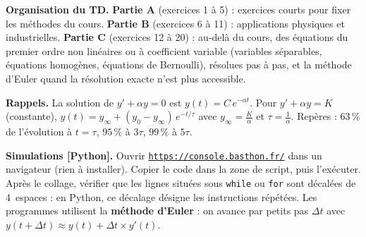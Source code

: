 \documentclass[a4paper,11pt]{article}
\newcommand{\py}{{\color{uimmred}\small\bfseries[Python]}}
\begin{document}
\vspace{6pt}

\begin{tcolorbox}[colback=uimmlightgray, colframe=uimmgray, boxrule=0.6pt, arc=2pt, left=8pt, right=8pt, top=4pt, bottom=4pt]
\small\textbf{Organisation du TD.}
\textbf{Partie A} (exercices 1 à 5) : exercices courts pour fixer les méthodes du cours.
\textbf{Partie B} (exercices 6 à 11) : applications physiques et industrielles.
\textbf{Partie C} (exercices 12 à 20) : au-delà du cours, des équations du premier ordre non linéaires ou à coefficient variable (variables séparables, équations homogènes, équations de Bernoulli), résolues pas à pas, et la méthode d'Euler quand la résolution exacte n'est plus accessible.

\smallskip
\textbf{Rappels.} La solution de $y' + \alpha y = 0$ est $y(t) = C\,e^{-\alpha t}$. Pour $y' + \alpha y = K$ (constante), $y(t) = y_\infty + (y_0 - y_\infty)\,e^{-t/\tau}$ avec $y_\infty = \frac{K}{\alpha}$ et $\tau = \frac{1}{\alpha}$. Repères : $63\,\%$ de l'évolution à $t = \tau$, $95\,\%$ à $3\tau$, $99\,\%$ à $5\tau$.

\smallskip
\textbf{Simulations \py.} Ouvrir \href{https://console.basthon.fr/}{\texttt{https://console.basthon.fr/}} dans un navigateur (rien à installer). Copier le code dans la zone de script, puis l'exécuter. Après le collage, vérifier que les lignes situées sous \texttt{while} ou \texttt{for} sont décalées de 4~espaces : en Python, ce décalage désigne les instructions répétées. Les programmes utilisent la \textbf{méthode d'Euler} : on avance par petits pas $\Delta t$ avec $y(t + \Delta t) \approx y(t) + \Delta t \times y'(t)$.
\end{tcolorbox}
\end{document}
